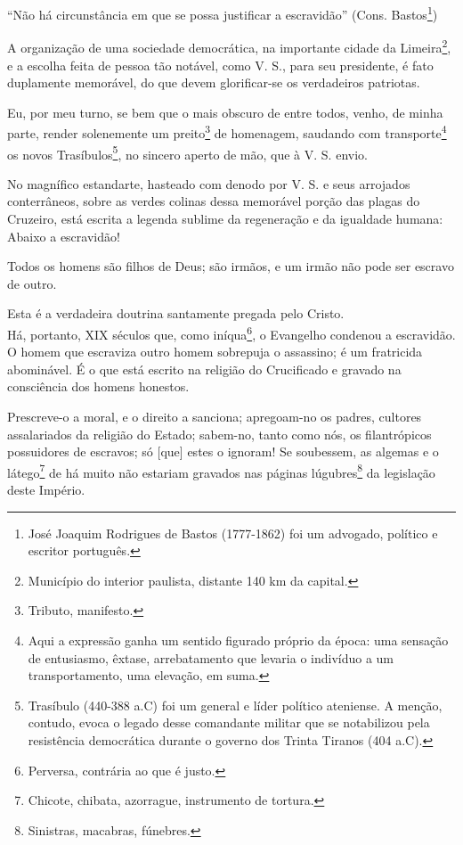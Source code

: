 ``Não há circunstância em que se possa justificar a escravidão'' (Cons.
Bastos\footnote{José Joaquim Rodrigues de Bastos (1777-1862) foi um
  advogado, político e escritor português.})

A organização de uma sociedade democrática, na importante cidade da
Limeira\footnote{Município do interior paulista, distante 140 km da
  capital.}, e a escolha feita de pessoa tão notável, como V. S., para
seu presidente, é fato duplamente memorável, do que devem glorificar-se
os verdadeiros patriotas.

Eu, por meu turno, se bem que o mais obscuro de entre todos, venho, de
minha parte, render solenemente um preito\footnote{Tributo, manifesto.}
de homenagem, saudando com transporte\footnote{Aqui a expressão ganha
  um sentido figurado próprio da época: uma sensação de entusiasmo,
  êxtase, arrebatamento que levaria o indivíduo a um transportamento,
  uma elevação, em suma.} os novos Trasíbulos\footnote{Trasíbulo
  (440-388 a.C) foi um general e líder político ateniense. A menção,
  contudo, evoca o legado desse comandante militar que se notabilizou
  pela resistência democrática durante o governo dos Trinta Tiranos (404
  a.C).}, no sincero aperto de mão, que à V. S. envio.

No magnífico estandarte, hasteado com denodo por V. S. e seus arrojados
conterrâneos, sobre as verdes colinas dessa memorável porção das plagas
do Cruzeiro, está escrita a legenda sublime da regeneração e da
igualdade humana: Abaixo a escravidão!

Todos os homens são filhos de Deus; são irmãos, e um irmão não pode ser
escravo de outro.

Esta é a verdadeira doutrina santamente pregada pelo Cristo.\\
Há, portanto, XIX séculos que, como iníqua\footnote{Perversa,
  contrária ao que é justo.}, o Evangelho condenou a escravidão.\\
O homem que escraviza outro homem sobrepuja o assassino; é um fratricida
abominável. É o que está escrito na religião do Crucificado e gravado na
consciência dos homens honestos.

Prescreve-o a moral, e o direito a sanciona; apregoam-no os padres,
cultores assalariados da religião do Estado; sabem-no, tanto como nós,
os filantrópicos possuidores de escravos; só {[}que{]} estes o ignoram!
Se soubessem, as algemas e o látego\footnote{Chicote, chibata,
  azorrague, instrumento de tortura.} de há muito não estariam gravados
nas páginas lúgubres\footnote{Sinistras, macabras, fúnebres.} da
legislação deste Império.

